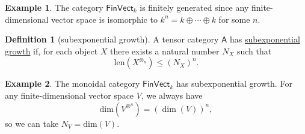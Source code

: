 \documentclass[a4paper]{report}
\newcommand{\defn}[1]{\ul{#1}}
\theoremstyle{definition}
\newtheorem{definition}{Definition}[section]
\newtheorem{example}{Example}[section]
\theoremstyle{plain}
\theoremstyle{remark}
\begin{document}
\begin{example}
  The category $\mathsf{FinVect}_{k}$ is finitely generated since any finite-dimensional vector space is isomorphic to $k^{n} = k \oplus \cdots \oplus k$ for some $n$.
\end{example}

\begin{definition}[subexponential growth]
  \label{def:subexponentialgrowth}
  A tensor category $\mathsf{A}$ has \defn{subexponential growth} if, for each object $X$ there exists a natural number $N_{X}$ such that 
  \begin{equation*}
    \mathrm{len}(X^{\otimes_{n}}) \leq (N_{X})^{n}.
  \end{equation*}
\end{definition}

\begin{example}
  The monoidal category $\mathsf{FinVect}_{k}$ has subexponential growth. For any finite-dimensional vector space $V$, we always have 
  \begin{equation*}
    \mathrm{dim}(V^{\otimes^{n}}) = (\dim(V))^{n},
  \end{equation*}
  so we can take $N_{V} = \mathrm{dim}(V)$.
\end{example}
\end{document}
